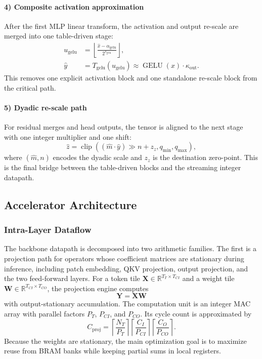 \documentclass[journal]{IEEEtran}
\begin{document}
\paragraph*{4) Composite activation approximation}
After the first MLP linear transform, the activation and output re-scale are merged into one table-driven stage:
\begin{align}
u_{\mathrm{gelu}} &= \left\lfloor \frac{\hat x-\alpha_{\mathrm{gelu}}}{2^{s_{\mathrm{gelu}}}} \right\rfloor,\\
\hat y &= T_{\mathrm{gelu}}\!\left(u_{\mathrm{gelu}}\right)
\approx \operatorname{GELU}(x)\cdot\kappa_{\mathrm{out}}.
\end{align}
This removes one explicit activation block and one standalone re-scale block from the critical path.

\paragraph*{5) Dyadic re-scale path}
For residual merges and head outputs, the tensor is aligned to the next stage with one integer multiplier and one shift:
\begin{equation}
\hat z = \operatorname{clip}\!\left(\left(\hat m \cdot \hat y\right)\gg n + z_z,
q_{\min},q_{\max}\right),
\end{equation}
where $(\hat m,n)$ encodes the dyadic scale and $z_z$ is the destination zero-point. This is the final bridge between the table-driven blocks and the streaming integer datapath.

\subsection{Accelerator Architecture}
\subsubsection{Intra-Layer Dataflow}
The backbone datapath is decomposed into two arithmetic families. The first is a projection path for operators whose coefficient matrices are stationary during inference, including patch embedding, QKV projection, output projection, and the two feed-forward layers. For a token tile $\mathbf X\in\mathbb R^{T_T\times T_{CI}}$ and a weight tile $\mathbf W\in\mathbb R^{T_{CI}\times T_{CO}}$, the projection engine computes
\begin{equation}
\mathbf Y = \mathbf X\mathbf W
\end{equation}
with output-stationary accumulation. The computation unit is an integer MAC array with parallel factors $P_T$, $P_{CI}$, and $P_{CO}$. Its cycle count is approximated by
\begin{equation}
C_{\mathrm{proj}}=
\left\lceil\frac{N_T}{P_T}\right\rceil
\left\lceil\frac{C_I}{P_{CI}}\right\rceil
\left\lceil\frac{C_O}{P_{CO}}\right\rceil.
\end{equation}
Because the weights are stationary, the main optimization goal is to maximize reuse from BRAM banks while keeping partial sums in local registers.
\end{document}
